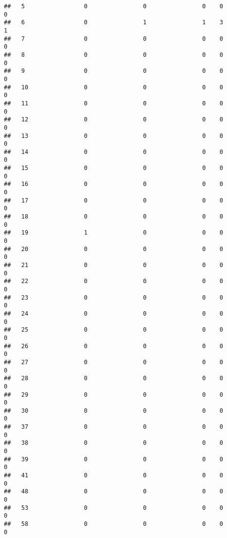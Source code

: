 \documentclass[]{article}
\begin{document}
\begin{verbatim}
##   5                 0                0                0    0                0
##   6                 0                1                1    3                1
##   7                 0                0                0    0                0
##   8                 0                0                0    0                0
##   9                 0                0                0    0                0
##   10                0                0                0    0                0
##   11                0                0                0    0                0
##   12                0                0                0    0                0
##   13                0                0                0    0                0
##   14                0                0                0    0                0
##   15                0                0                0    0                0
##   16                0                0                0    0                0
##   17                0                0                0    0                0
##   18                0                0                0    0                0
##   19                1                0                0    0                0
##   20                0                0                0    0                0
##   21                0                0                0    0                0
##   22                0                0                0    0                0
##   23                0                0                0    0                0
##   24                0                0                0    0                0
##   25                0                0                0    0                0
##   26                0                0                0    0                0
##   27                0                0                0    0                0
##   28                0                0                0    0                0
##   29                0                0                0    0                0
##   30                0                0                0    0                0
##   37                0                0                0    0                0
##   38                0                0                0    0                0
##   39                0                0                0    0                0
##   41                0                0                0    0                0
##   48                0                0                0    0                0
##   53                0                0                0    0                0
##   58                0                0                0    0                0

\end{verbatim}
\end{document}
